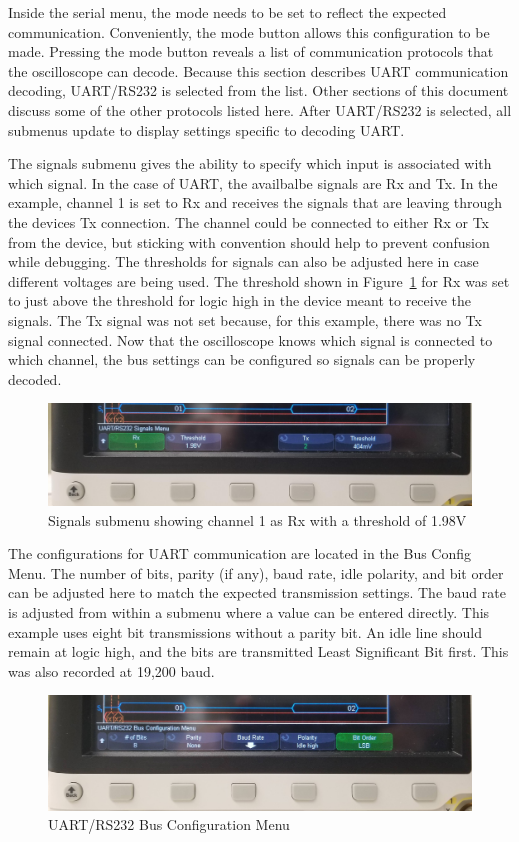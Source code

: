 \documentclass{article}
\begin{document}
  Inside the serial menu, the mode needs to be set to reflect the expected
  communication. Conveniently, the mode button allows this configuration to be
  made. Pressing the mode button reveals a list of communication protocols that
  the oscilloscope can decode. Because this section describes UART communication
  decoding, UART/RS232 is selected from the list. Other sections of this
  document discuss some of the other protocols listed here. After UART/RS232 is
  selected, all submenus update to display settings
  specific to decoding UART.\@

  The signals submenu gives the ability to specify which input is associated
  with which signal. In the case of UART, the availbalbe signals are Rx and Tx.
  In the example, channel 1 is set to Rx and receives the signals that are
  leaving through the devices Tx connection. The channel could be connected to
  either Rx or Tx from the device, but sticking with convention should help to
  prevent confusion while debugging. The thresholds for signals can also be
  adjusted here in case different voltages are being used. The threshold shown
  in Figure~\ref{fig:uart_signals_menu} for Rx was set to just above the threshold
  for logic high in the device meant to receive the signals. The Tx signal was
  not set because, for this example, there was no Tx signal connected. Now that
  the oscilloscope knows which signal is connected to which channel, the bus
  settings can be configured so signals can be properly decoded.

  \begin{figure}[h]
    \includegraphics[width=\textwidth]{signals_menu}
    \caption{Signals submenu showing channel 1 as Rx with a threshold of 1.98V}
    \label{fig:uart_signals_menu}
  \end{figure}

  The configurations for UART communication are located in the Bus Config Menu.
  The number of bits, parity (if any), baud rate, idle polarity, and bit order
  can be adjusted here to match the expected transmission settings. The baud
  rate is adjusted from within a submenu where a value can be entered directly.
  This example uses eight bit transmissions without a parity bit. An idle line
  should remain at logic high, and the bits are transmitted Least Significant
  Bit first. This was also recorded at 19,200 baud.

  \begin{figure}[h]
    \includegraphics[width=\textwidth]{bus_config}
    \caption{UART/RS232 Bus Configuration Menu}
  \end{figure}

\end{document}
